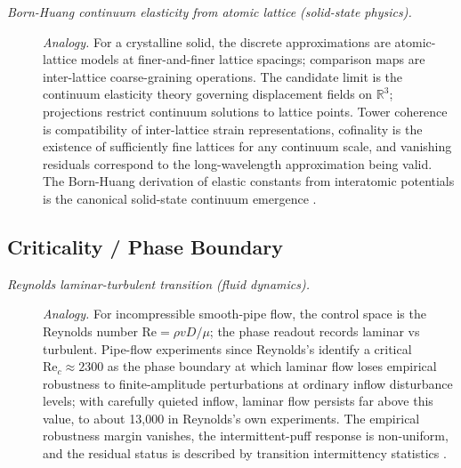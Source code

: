 \begin{description}
\item[\emph{Born-Huang continuum elasticity from
atomic lattice (solid-state physics).}] \textit{Analogy.}
For a crystalline solid, the discrete
approximations are atomic-lattice models at
finer-and-finer lattice spacings; comparison maps
are inter-lattice coarse-graining operations.
The candidate limit is the continuum elasticity
theory governing displacement fields on
\(\mathbb R^3\); projections restrict continuum
solutions to lattice points.  Tower coherence is
compatibility of inter-lattice strain
representations, cofinality is the existence of
sufficiently fine lattices for any continuum
scale, and vanishing residuals correspond to the
long-wavelength approximation being valid.  The
Born-Huang derivation of elastic constants from
interatomic potentials is the canonical
solid-state  continuum emergence
\citep{BornHuang1954Dynamical}.
\end{description}
\endgroup

\subsection*{ Criticality / Phase Boundary}
\begingroup\small
\begin{description}
\item[\emph{Reynolds laminar-turbulent transition
(fluid dynamics).}] \textit{Analogy.}
For incompressible smooth-pipe flow, the control
space is the Reynolds number
\(\mathrm{Re}=\rho v D/\mu\); the phase readout
records laminar vs turbulent.  Pipe-flow
experiments since Reynolds's identify a critical
\(\mathrm{Re}_c\approx 2300\) as the phase boundary at which laminar
flow loses empirical robustness to finite-amplitude perturbations at
ordinary inflow disturbance levels; with carefully quieted inflow,
laminar flow persists far above this value, to about 13{,}000 in
Reynolds's own experiments.  The
empirical robustness margin vanishes, the
intermittent-puff response is non-uniform, and the
residual status is described by transition
intermittency statistics
\citep{Reynolds1883Turbulent}.
\end{description}
\endgroup

